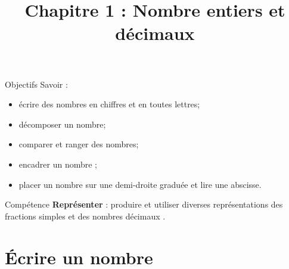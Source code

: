 \documentclass[xcolor={dvipsnames}]{beamer}
\title{Chapitre 1 : Nombre entiers et décimaux}
\begin{document}
\begin{frame}
  \titlepage 
\end{frame}


	
\begin{frame}
	\begin{block}{Objectifs}
		Savoir :
		\begin{itemize}
			
			\item  écrire des nombres en chiffres et en toutes lettres;
			\item décomposer un nombre;
			\item comparer et ranger des nombres;
			\item  encadrer un nombre ;
			\item placer un nombre sur une demi-droite graduée et lire une abscisse.\pause
		\end{itemize}
	\end{block}


	\begin{block}{Compétence}
		\textbf{Représenter} :
		produire et utiliser diverses représentations des fractions simples et des nombres décimaux .
	\end{block}
\end{frame}


\section{\'Ecrire un nombre}
\end{document}
